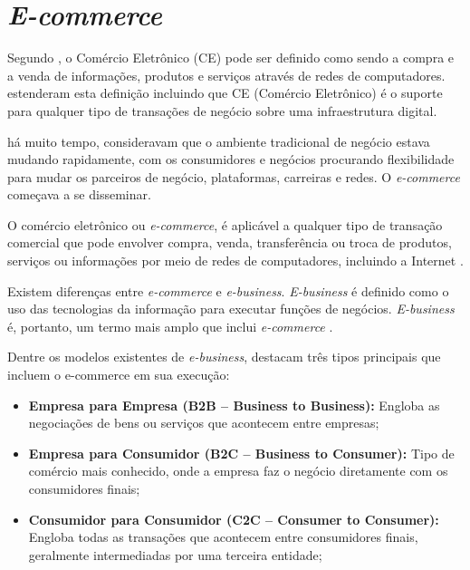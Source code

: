 \documentclass[a4paper,12pt]{monografia}
\begin{document}

\section{\textit{E-commerce}} %
\label{sec:e_commerce} 

Segundo , o Comércio Eletrônico (CE) pode ser definido como sendo a compra e a venda de informações, produtos e serviços através de redes de computadores.  estenderam esta definição incluindo que CE (Comércio Eletrônico) é o suporte para qualquer tipo de transações de negócio sobre uma infraestrutura digital.

 há muito tempo, consideravam que o ambiente tradicional de negócio estava mudando rapidamente, com os consumidores e negócios procurando flexibilidade para mudar os parceiros de negócio, plataformas, carreiras e redes. O \textit{e-commerce} começava a se disseminar.

\begin{citacao}
	O comércio eletrônico ou \textit{e-commerce}, é aplicável a qualquer tipo de transação comercial que pode envolver compra, venda, transferência ou troca de produtos, serviços ou informações por meio de redes de computadores, incluindo a Internet \cite{turban}.
\end{citacao}

Existem diferenças entre \textit{e-commerce} e \textit{e-business}. \textit{E-business} é definido como o uso das tecnologias da informação para executar funções de negócios. \textit{E-business} é, portanto, um termo mais amplo que inclui \textit{e-commerce} \cite{gordon}. 

Dentre os modelos existentes de \textit{e-business},  destacam três tipos principais que incluem o e-commerce em sua execução:

\begin{itemize}
\item \textbf{Empresa para Empresa (B2B – Business to Business):} Engloba as negociações de bens ou serviços que acontecem entre empresas;
\item \textbf{Empresa para Consumidor (B2C – Business to Consumer):} Tipo de comércio mais conhecido, onde a empresa faz o negócio diretamente com os consumidores finais;
\item \textbf{Consumidor para Consumidor (C2C – Consumer to Consumer):} Engloba todas as transações que acontecem entre consumidores finais, geralmente intermediadas por uma terceira entidade;
\end{itemize}
\end{document}
